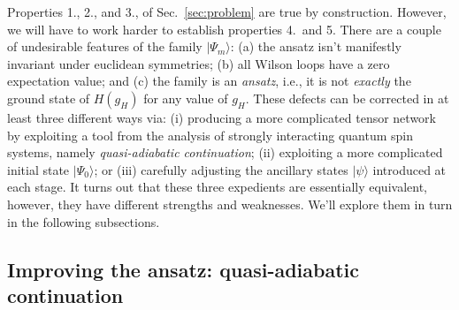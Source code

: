 \documentclass[twocolumn,lengthcheck,superscriptaddress]{revtex4-1}
\theoremstyle{definition}
\theoremstyle{remark}
\begin{document}
Properties 1., 2., and 3., of Sec.~\ref{sec:problem} are true by construction. However, we will have to work harder to establish properties 4.\ and 5. There are a couple of undesirable features of the family $|\Psi_m\rangle$: (a) the ansatz isn't manifestly invariant under euclidean symmetries; (b) all Wilson loops have a zero expectation value; and (c) the family is an \emph{ansatz}, i.e., it is not \emph{exactly} the ground state of $H(g_H)$ for any value of $g_H$. These defects can be corrected in at least three different ways via: (i) producing a more complicated tensor network by exploiting a tool from the analysis of strongly interacting quantum spin systems, namely \emph{quasi-adiabatic continuation}; (ii) exploiting a more complicated initial state $|\Psi_0\rangle$; or (iii) carefully adjusting the ancillary states $|\psi\rangle$ introduced at each stage. It turns out that these three expedients are essentially equivalent, however, they have different strengths and weaknesses. We'll explore them in turn in the following subsections.  

\subsection{Improving the ansatz: quasi-adiabatic continuation}
\end{document}
